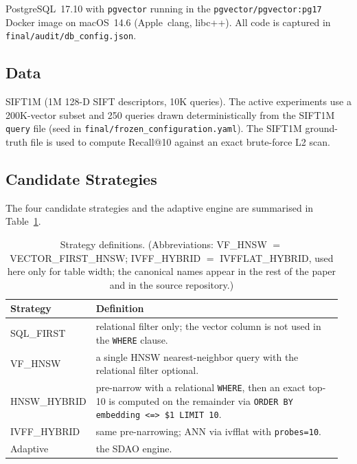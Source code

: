 \documentclass[conference]{IEEEtran}
\begin{document}
PostgreSQL~17.10 with \texttt{pgvector} running in the
\texttt{pgvector/pgvector:pg17} Docker image on macOS~14.6
(Apple~clang, libc++). All code is captured in
\texttt{final/audit/db\_config.json}.

\subsection{Data}
\label{sec:data}

SIFT1M (1M 128-D SIFT descriptors, 10K queries). The active experiments
use a 200K-vector subset and 250 queries drawn deterministically from the
SIFT1M \texttt{query} file (seed in
\texttt{final/frozen\_configuration.yaml}). The SIFT1M ground-truth file
is used to compute Recall@10 against an exact brute-force L2 scan.

\subsection{Candidate Strategies}
\label{sec:strategies}

The four candidate strategies and the adaptive engine are summarised in
Table~\ref{tab:strategies}.

\begin{table}[t]
\centering
\caption{Strategy definitions. (Abbreviations: VF\_HNSW $=$ VECTOR\_FIRST\_HNSW; IVFF\_HYBRID $=$ IVFFLAT\_HYBRID, used here only for table width; the canonical names appear in the rest of the paper and in the source repository.)}
\label{tab:strategies}
\begin{tabular}{p{0.18\linewidth} p{0.78\linewidth}@{}}
\toprule
\textbf{Strategy} & \textbf{Definition} \\
\midrule
SQL\_FIRST         & relational filter only; the vector column is not used in the \texttt{WHERE} clause. \\
VF\_HNSW           & a single HNSW nearest-neighbor query with the relational filter optional. \\
HNSW\_HYBRID       & pre-narrow with a relational \texttt{WHERE}, then an exact top-10 is computed on the remainder via \texttt{ORDER BY embedding <=> \$1 LIMIT 10}. \\
IVFF\_HYBRID       & same pre-narrowing; ANN via ivfflat with \texttt{probes=10}. \\
Adaptive           & the SDAO engine. \\
\bottomrule
\end{tabular}
\end{table}
\end{document}
